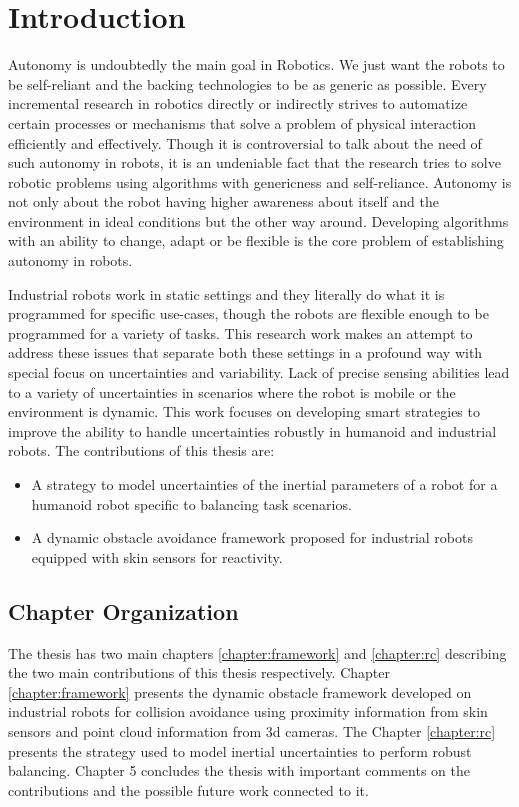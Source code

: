 \documentclass[a4paper,11pt,twoside]{StyleThese}
\begin{document}
\fi

\chapter*{Introduction}
Autonomy is undoubtedly the main goal in Robotics. We just want the robots to be self-reliant and the backing technologies to be as generic as possible. Every incremental research in robotics  directly or indirectly strives to automatize certain processes or mechanisms that solve a problem of physical interaction efficiently and effectively. Though it is controversial to talk about the need of such autonomy in robots, it is an undeniable fact that the research tries to solve robotic problems using algorithms with genericness and self-reliance. Autonomy is not only about the robot having higher awareness about itself and the environment in ideal conditions but the other way around. Developing algorithms with an ability to change, adapt or be flexible is the core problem of establishing autonomy in robots. 

Industrial robots work in static settings and they literally do what it is programmed for specific use-cases, though the robots are flexible enough to be programmed for a variety of tasks. This research work makes an attempt to address these issues that separate both these settings in a profound way with special focus on uncertainties and variability. Lack of precise sensing abilities lead to a variety of uncertainties in scenarios where the robot is mobile or the environment is dynamic. This work focuses on developing smart strategies to improve the ability to handle uncertainties robustly in humanoid and industrial robots. The contributions of this thesis are:
\begin{itemize}
    \item A strategy to model uncertainties of the inertial parameters of a robot for a humanoid robot specific to balancing task scenarios.
    \item A dynamic obstacle avoidance framework proposed for industrial robots equipped with skin sensors for reactivity. 
\end{itemize}





\section{Chapter Organization}
The thesis has two main chapters \ref{chapter:framework} and \ref{chapter:rc} describing the two main contributions of this thesis respectively. Chapter \ref{chapter:framework} presents the dynamic obstacle framework developed on industrial robots for collision avoidance using proximity information from skin sensors and point cloud information from 3d cameras. The Chapter \ref{chapter:rc} presents the strategy used to model inertial uncertainties to perform robust balancing. Chapter 5 concludes the thesis with important comments on the contributions and the possible future work connected to it.
\end{document}
